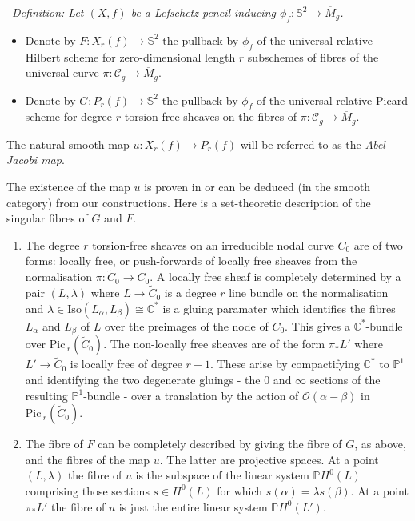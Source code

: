 \documentclass[10pt]{article}
\newcommand{\pp}{\mathbb{P}}
\newcommand{\cc}{\mathbb{C}}
\newcommand{\sss}{\mathbb{S}}
\newcommand{\Pic}{\mathrm{Pic \,}}
\newcommand{\mgbar}{\overline{M}_g}
\newcounter{Universal}[section]
\renewcommand{\theUniversal}{\thesection.\arabic{Universal}}
\newenvironment{Italic}{\refstepcounter{Universal} \par \vspace{0.5cm}
\noindent {\bf (\theUniversal)}\ \it}{\par \vspace{0.5cm}}
\newenvironment{Defn}{\begin{Italic}{\sc Definition: } }{\end{Italic}}
\newcounter{enum}
\begin{document}
\begin{Defn} \label{Hilbetc}
Let $(X,f)$ be a Lefschetz pencil inducing $\phi_f: \sss^2 \rightarrow
\mgbar$.  
\begin{itemize}
\item Denote by $F:X_r(f)\rightarrow \sss^2$ the pullback by $\phi_f$ 
of the universal relative Hilbert scheme for zero-dimensional length
$r$ subschemes of fibres of the universal curve $\pi: \mathcal{C}_g
\rightarrow \mgbar$.  
\item Denote by $G:P_r (f)\rightarrow \sss^2$ the pullback by $\phi_f$
of the universal relative Picard scheme for degree $r$ torsion-free
sheaves on the fibres of $\pi: \mathcal{C}_g \rightarrow \mgbar$.
\end{itemize}
\noindent The natural smooth map $u: X_r(f) \rightarrow
P_r(f)$ will be referred to as the \emph{Abel-Jacobi map}.
\end{Defn}

\noindent The existence of the map $u$ is proven in
\cite{Altman-Kleiman} or can be deduced (in the smooth category) from
our constructions.  Here is a set-theoretic description of the
singular fibres of $G$ and $F$.

\begin{enumerate}
\item The degree $r$ torsion-free sheaves on an irreducible nodal
  curve $C_0$ are of 
  two forms: locally free, or push-forwards of locally free sheaves
  from the normalisation $\pi: \tilde{C}_0 \rightarrow C_0$.  A
  locally free sheaf is completely
  determined by a pair $(L, \lambda)$ where $L \rightarrow
  \tilde{C}_0$ is a degree $r$ line bundle on the normalisation and
  $\lambda \in \mathrm{Iso}(L_{\alpha}, L_{\beta}) \cong \cc^*$ is a
  gluing paramater which identifies the fibres $L_{\alpha}$ and
  $L_{\beta}$ of $L$ over the preimages of the node of $C_0$.  This
  gives a $\cc^*$-bundle over $\Pic_r(\tilde{C}_0)$.  The
  non-locally free sheaves are of the form $\pi_* L'$ where $L'
  \rightarrow \tilde{C}_0$ is locally free of degree $r-1$.  These
  arise by compactifying $\cc^*$ to $\pp^1$ and identifying the two
  degenerate gluings - the $0$ and $\infty$ sections of the resulting
  $\pp^1$-bundle  - over a
  translation by the action of $\mathcal{O}(\alpha - \beta)$ in
  $\Pic_r(\tilde{C}_0)$. 

\item The fibre of $F$ can be completely described by giving the fibre
  of $G$, as above, and the fibres of the map $u$.  The latter are
  projective spaces.  At a point $(L, \lambda)$ the fibre of $u$ is
  the subspace of the linear system $\pp H^0 (L)$ comprising those
  sections $s \in H^0 (L)$ for which $s(\alpha) = \lambda s(\beta)$.
  At a point $\pi_* L'$ the fibre of $u$ is just the entire linear
  system $\pp H^0 (L')$.
\end{enumerate}
\end{document}
